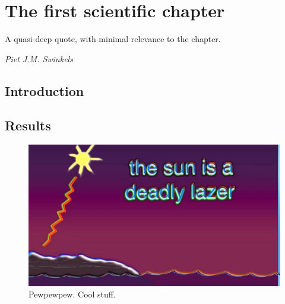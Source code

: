 \cleardoubleevenemptypage
\chapter{The first scientific chapter}
\label{ch:pfff}
\pgfmathsetmacro\chapclr{\colourarray[3]}
\hypersetup{
citecolor  = \chapclr,
linkcolor  = \chapclr,
urlcolor   = \chapclr,
}

\epigraph{
  A quasi-deep quote, with minimal relevance to the chapter.
  }{
    \textit{Piet J.M. Swinkels}
}

\begin{center}
    \begin{minipage}{\abstractwidth\textwidth}
      \begin{small}
        \blindtext[1]
      \end{small}
    \end{minipage}
    \vspace{0.5cm}
\end{center}

\clearpage

\section{Introduction}
\blindtext[2]
\section{Results}
\blindtext[1]
\blindmathpaper
\begin{figure}
  \centering
  \includegraphics[width=1.0\linewidth]{Sections/Chapter3/Figures/laser.jpg}
  \caption{
    \textcolor{\chapclr}{Pewpewpew.}
    Cool stuff.
    }
  \label{fig:ch3-laser}
\end{figure}
\blindtext[1]
